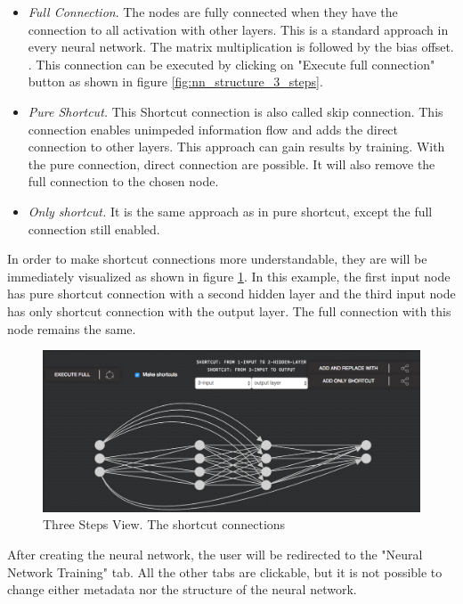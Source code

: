 \begin{itemize}
\item \emph{Full Connection}. The nodes are fully connected when they have the connection to all activation with other layers. This is a standard approach in every neural network. The matrix multiplication is followed by the bias offset. \cite{nn_connection}. This connection can be executed by clicking on "Execute full connection" button as shown in figure \ref{fig:nn_structure_3_steps}.
\item \emph{Pure Shortcut.} This Shortcut connection is also called skip connection. This connection enables unimpeded information flow and adds the direct connection to other layers. This approach can gain results by training. \cite{shortcuts_nn} With the pure connection, direct connection are possible. It will also remove the full connection to the chosen node.
\item \emph{Only shortcut.} It is the same approach as in pure shortcut, except the full connection still enabled. 
\end{itemize}

In order to make shortcut connections more understandable, they are will be immediately visualized as shown in figure \ref{fig:connection_3_steps}. In this example, the first input node has pure shortcut connection with a second hidden layer and the third input node has only shortcut connection with the output layer. The full connection with this node remains the same.

\begin{figure}[htbp]
\begin{center}
  \includegraphics[width=\linewidth]{components/5/img/connection_3_steps.png}
  \caption{Three Steps View. The shortcut connections}
  \label{fig:connection_3_steps}
\end{center}
\end{figure}

After creating the neural network, the user will be redirected to the "Neural Network Training" tab. All the other tabs are clickable, but it is not possible to change either metadata nor the structure of the neural network.

